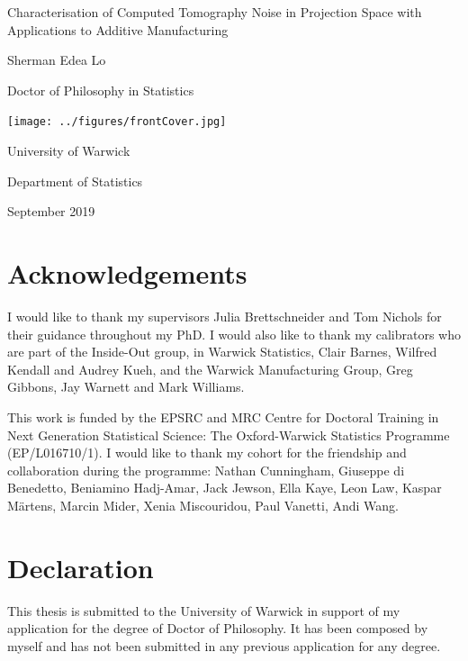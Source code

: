 \documentclass[12pt, a4paper, twoside]{memoir}
\begin{document}
\sloppy

%

\begin{titlingpage}
\centering
{\LARGE Characterisation of Computed Tomography Noise in Projection Space with Applications to Additive Manufacturing \par}
\vspace{1cm}
{\Large Sherman Edea Lo\par}
{\Large Doctor of Philosophy in Statistics\par}
\vfill
\texttt{[image: ../figures/frontCover.jpg]}
\vfill
{\Large University of Warwick\par}
{\Large Department of Statistics\par}
{\Large September 2019\par}
\end{titlingpage}


\frontmatter

\cleardoublepage
\tableofcontents*
\cleardoublepage
\listoffigures
\cleardoublepage
\listoftables

\chapter{Acknowledgements}
I would like to thank my supervisors Julia Brettschneider and Tom Nichols for their guidance throughout my PhD. I would also like to thank my calibrators who are part of the Inside-Out group, in Warwick Statistics, Clair Barnes, Wilfred Kendall and Audrey Kueh, and the Warwick Manufacturing Group, Greg Gibbons, Jay Warnett and Mark Williams.

This work is funded by the EPSRC and MRC Centre for Doctoral Training in Next Generation Statistical Science: The Oxford-Warwick Statistics Programme (EP/L016710/1). I would like to thank my cohort for the friendship and collaboration during the programme: Nathan Cunningham, Giuseppe di Benedetto, Beniamino Hadj-Amar, Jack Jewson, Ella Kaye, Leon Law, Kaspar M\"{a}rtens, Marcin Mider, Xenia Miscouridou, Paul Vanetti, Andi Wang.

\chapter{Declaration}
This thesis is submitted to the University of Warwick in support of my application for the degree of Doctor of Philosophy. It has been composed by myself and has not been submitted in any previous application for any degree.
\end{document}
